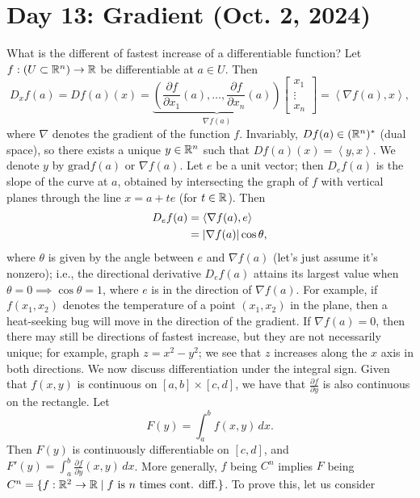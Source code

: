\section{Day 13: Gradient (Oct. 2, 2024)}
What is the different of fastest increase of a differentiable function? Let $f : (U \subset \mathbb R^n) \to \mathbb R$ be differentiable at $a \in U$. Then
\[ D_x f(a) = D f(a)(x) = \underbrace{\left( \frac{\partial f}{\partial x_1} (a), \dots, \frac{\partial f}{\partial x_n}(a)\right)}_{\nabla f(a)} \begin{bmatrix} x_1 \\ \vdots \\ x_n \end{bmatrix} = \left< \nabla f(a), x \right>, \]
where $\nabla$ denotes the gradient of the function $f$. Invariably, $D f(a) \in (\mathbb R^n)^\ast$ (dual space), so there exists a unique $y \in \mathbb R^n$ such that $D f(a) (x) = \left<y, x\right>$. We denote $y$ by $\mathrm{grad} f(a)$ or $\nabla f(a)$. Let $e$ be a unit vector; then $D_e f(a)$ is the slope of the curve at $a$, obtained by intersecting the graph of $f$ with vertical planes through the line $x = a + te$ (for $t \in \mathbb R$). Then
\begin{align*}
    D_e f(a) &= \left< \nabla f(a), e \right> \\
    &= \left\lvert \nabla f(a) \right\rvert \cos \theta,
\end{align*}
where $\theta$ is given by the angle between $e$ and $\nabla f(a)$ (let's just assume it's nonzero); i.e., the directional derivative $D_e f(a)$ attains its largest value when $\theta = 0 \implies \cos \theta = 1$, where $e$ is in the direction of $\nabla f(a)$. For example, if $f(x_1, x_2)$ denotes the temperature of a point $(x_1, x_2)$ in the plane, then a heat-seeking bug will move in the direction of the gradient. If $\nabla f(a) = 0$, then there may still be directions of fastest increase, but they are not necessarily unique; for example, graph $z = x^2 - y^2$; we see that $z$ increases along the $x$ axis in both directions.
\medskip\newline
We now discuss differentiation under the integral sign. Given that $f(x, y)$ is continuous on $[a, b] \times [c, d]$, we have that $\frac{\partial f}{\partial y}$ is also continuous on the rectangle. Let
\[ F(y) = \int_a^b f(x, y) \, dx. \]
Then $F(y)$ is continuously differentiable on $[c, d]$, and $F'(y) = \int_a^b \frac{\partial f}{\partial y}(x, y) \, dx$. 
More generally, $f$ being $C^n$ implies $F$ being $C^n = \{f : \mathbb R^2 \to \mathbb R \mid f \text{ is } n \text{ times cont. diff.}\}$. To prove this, let us consider
